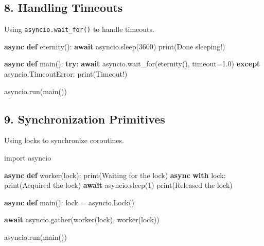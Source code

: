 \documentclass[
  letterpaper,
  DIV=11,
  numbers=noendperiod]{scrreprt}
\newenvironment{Shaded}{\begin{snugshade}}{\end{snugshade}}
\newcommand{\BuiltInTok}[1]{\textcolor[rgb]{0.00,0.23,0.31}{#1}}
\newcommand{\ControlFlowTok}[1]{\textcolor[rgb]{0.00,0.23,0.31}{\textbf{#1}}}
\newcommand{\DecValTok}[1]{\textcolor[rgb]{0.68,0.00,0.00}{#1}}
\newcommand{\FloatTok}[1]{\textcolor[rgb]{0.68,0.00,0.00}{#1}}
\newcommand{\ImportTok}[1]{\textcolor[rgb]{0.00,0.46,0.62}{#1}}
\newcommand{\KeywordTok}[1]{\textcolor[rgb]{0.00,0.23,0.31}{\textbf{#1}}}
\newcommand{\NormalTok}[1]{\textcolor[rgb]{0.00,0.23,0.31}{#1}}
\newcommand{\OperatorTok}[1]{\textcolor[rgb]{0.37,0.37,0.37}{#1}}
\newcommand{\PreprocessorTok}[1]{\textcolor[rgb]{0.68,0.00,0.00}{#1}}
\newcommand{\StringTok}[1]{\textcolor[rgb]{0.13,0.47,0.30}{#1}}
\begin{document}
\subsection{8. Handling Timeouts}\label{handling-timeouts}

Using \texttt{asyncio.wait\_for()} to handle timeouts.

\begin{Shaded}
\begin{Highlighting}[]
\ControlFlowTok{async} \KeywordTok{def}\NormalTok{ eternity():}
    \ControlFlowTok{await}\NormalTok{ asyncio.sleep(}\DecValTok{3600}\NormalTok{)}
    \BuiltInTok{print}\NormalTok{(}\StringTok{\textquotesingle{}Done sleeping!\textquotesingle{}}\NormalTok{)}

\ControlFlowTok{async} \KeywordTok{def}\NormalTok{ main():}
    \ControlFlowTok{try}\NormalTok{:}
        \ControlFlowTok{await}\NormalTok{ asyncio.wait\_for(eternity(), timeout}\OperatorTok{=}\FloatTok{1.0}\NormalTok{)}
    \ControlFlowTok{except}\NormalTok{ asyncio.}\PreprocessorTok{TimeoutError}\NormalTok{:}
        \BuiltInTok{print}\NormalTok{(}\StringTok{\textquotesingle{}Timeout!\textquotesingle{}}\NormalTok{)}

\NormalTok{asyncio.run(main())}
\end{Highlighting}
\end{Shaded}

\subsection{9. Synchronization
Primitives}\label{synchronization-primitives}

Using locks to synchronize coroutines.

\begin{Shaded}
\begin{Highlighting}[]
\ImportTok{import}\NormalTok{ asyncio}

\ControlFlowTok{async} \KeywordTok{def}\NormalTok{ worker(lock):}
    \BuiltInTok{print}\NormalTok{(}\StringTok{\textquotesingle{}Waiting for the lock\textquotesingle{}}\NormalTok{)}
    \ControlFlowTok{async} \ControlFlowTok{with}\NormalTok{ lock:}
        \BuiltInTok{print}\NormalTok{(}\StringTok{\textquotesingle{}Acquired the lock\textquotesingle{}}\NormalTok{)}
        \ControlFlowTok{await}\NormalTok{ asyncio.sleep(}\DecValTok{1}\NormalTok{)}
    \BuiltInTok{print}\NormalTok{(}\StringTok{\textquotesingle{}Released the lock\textquotesingle{}}\NormalTok{)}

\ControlFlowTok{async} \KeywordTok{def}\NormalTok{ main():}
\NormalTok{    lock }\OperatorTok{=}\NormalTok{ asyncio.Lock()}

    \ControlFlowTok{await}\NormalTok{ asyncio.gather(worker(lock), worker(lock))}

\NormalTok{asyncio.run(main())}
\end{Highlighting}
\end{Shaded}
\end{document}
